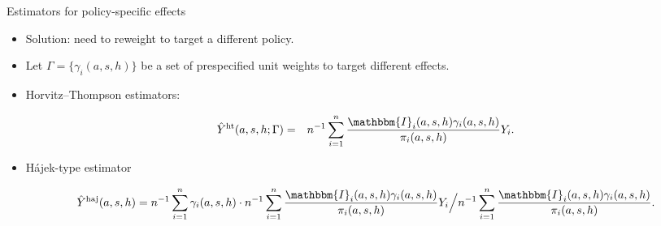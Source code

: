 \documentclass[aspectratio=169]{beamer}
\newcommand{\sumi}{\sum_{i=1}^n}
\newcommand{\horthom}{\textup{ht}}
\newcommand{\haj}{\textup{haj}}
\newcommand{\bbI}{\mathbbm{I}}
\newcommand{\pscore}[1]{\pi_{#1}}
\begin{document}
\begin{frame}{Estimators for policy-specific effects}
\begin{itemize}
    \pause 
    \item Solution: need to reweight to target a different policy. 
    \pause 
    
    \item Let $\Gamma = \{\gamma_i(a,s,h)\}$ be a set of prespecified unit weights to target different effects. 
    \pause
    
    \item Horvitz--Thompson estimators:
    \begin{small}
    \begin{eqnarray*}
        \hat{Y}^{\horthom}(a,s,h;\Gamma) &=& n^{-1}\sumi\frac{ \bbI_{i}(a,s,h)\gamma_i(a,s,h)}{ \pscore{i}(a,s,h)}Y_{i}. 
    \end{eqnarray*}
    \end{small}
    \pause
    
    \item H\'{a}jek-type estimator
    \begin{small}
    \begin{equation*}
    \hat{Y}^{\haj}(a,s,h) = n^{-1}\sumi \gamma_i(a,s,h)\cdot n^{-1}\sumi\frac{ \bbI_{i}(a,s,h) \gamma_i(a,s,h)}{ \pscore{i}(a,s,h)}Y_{i} \Big / n^{-1}\sumi\frac{ \bbI_{i}(a,s,h) \gamma_i(a,s,h)}{ \pscore{i}(a,s,h)}. 
    \end{equation*}
    \end{small} 
\end{itemize}
  


\end{frame}
\end{document}
